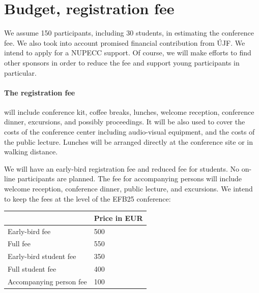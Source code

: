 \documentclass[12pt]{extarticle}
\begin{document}
\section*{Budget, registration fee}
\noindent
We assume 150 participants, including 30 students, in estimating the
conference fee. We also took into account promised financial
contribution from ÚJF. We intend to apply for a NUPECC support. Of
course, we will make efforts to find other sponsors in order to reduce
the fee and support young participants in particular.

\paragraph{The registration fee} will include conference kit, coffee
breaks, lunches, welcome reception, conference dinner, excursions, and
possibly proceedings. It will be also used to cover the costs of the
conference center including audio-visual equipment, and the costs of
the public lecture. Lunches will be arranged directly at the
conference site or in walking distance.

We will have an early-bird registration fee and reduced fee for
students. No on-line participants are planned. The fee for
accompanying persons will include welcome reception, conference
dinner, public lecture, and excursions. We intend to keep the fees at
the level of the EFB25 conference:

\smallskip
\begin{center}
  \begin{tabular}{ll}
    \hline %
    &   Price in EUR  \\%
    \hline %
    Early-bird fee & 500  \\%
    Full fee &  550 \\%
    Early-bird student fee & 350  \\%
    Full student fee &  400 \\%
    Accompanying person fee & 100  \\%
    \hline
  \end{tabular}
\end{center}


%
\end{document}
